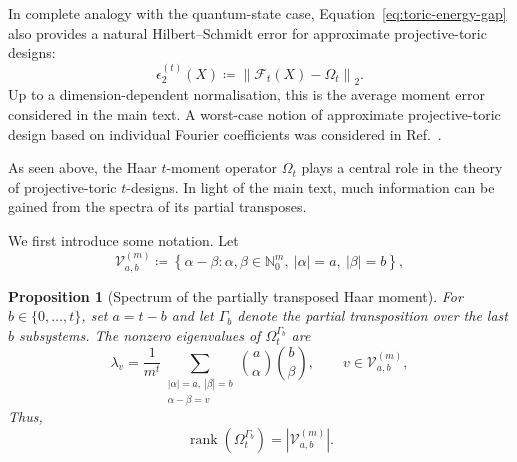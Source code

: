 \documentclass[aps,twocolumn,pra,superscriptaddress,nofootinbib]{revtex4-2}
\newtheorem{prop}{Proposition}
\newcommand{\mF}{\mathcal{F}}
\begin{document}
In complete analogy with the quantum-state
case, Equation~\eqref{eq:toric-energy-gap} also provides a natural
Hilbert--Schmidt error for approximate projective-toric designs:
\begin{equation}
    \epsilon_{2}^{(t)}(X)
    \coloneqq
    \left\|\mF_{t}(X)-\Omega_{t}\right\|_{2}.
    \label{eq:toric-HS-error}
\end{equation}
Up to a dimension-dependent normalisation, this is the average
moment error considered in the main text. A worst-case notion of approximate
projective-toric design based on individual Fourier coefficients
was considered in Ref.~\cite{IosueEtAl2024}.













As seen above, the Haar $t$-moment operator $\Omega_{t}$ plays a central
role in the theory of projective-toric $t$-designs. In light of the main text, much information can be gained from the
spectra of its partial transposes.

We first introduce some notation. Let
\begin{equation}
    \mathcal{V}_{a,b}^{(m)}
    \coloneqq
    \left\{
        \alpha-\beta:
        \alpha,\beta\in\mathbb{N}_0^m,\ 
        |\alpha|=a,\ 
        |\beta|=b
    \right\},
    \label{eq:definition-Vab}
\end{equation}


\begin{prop}[Spectrum of the partially transposed Haar moment]
    \label{prop:PT-toric-Haar-spectrum}
     For $b\in\{0,\dotsc,t\}$, set $a=t-b$ and let $\mathsf{\Gamma}_{b}$ denote the partial transposition over the last $b$ subsystems. The nonzero eigenvalues of $\Omega_t^{\mathsf{\Gamma}_b}$ are
    \begin{equation}
        \lambda_v
        =
        \frac{1}{m^t}
        \sum_{\substack{|\alpha|=a,\ |\beta|=b\\
                        \alpha-\beta=v}}
        \binom{a}{\alpha}
        \binom{b}{\beta},
        \qquad
        v\in\mathcal{V}_{a,b}^{(m)},
        \label{eq:PT-toric-eigenvalues}
    \end{equation}
    Thus,
    \begin{equation}
        \operatorname{rank}\!\left(\Omega_t^{\mathsf{\Gamma}_b}\right)
        =
        \left|\mathcal{V}_{a,b}^{(m)}\right|.
        \label{eq:PT-toric-rank}
    \end{equation}
\end{prop}
\end{document}
